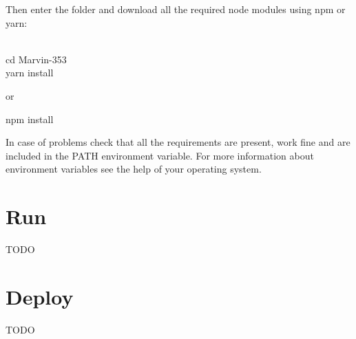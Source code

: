 \documentclass[ManualeSviluppatore.tex]{subfiles}
\begin{document}
Then enter the folder and download all the required node modules using npm or yarn: \\
\\
\begin{ttfamily}
	cd Marvin-353 \\
	yarn install \\
\end{ttfamily}
or \\
\begin{ttfamily}
npm install \\
\end{ttfamily}

In case of problems check that all the requirements are present, work fine and are included in the PATH environment variable. For more information about environment variables see the help of your operating system. \\


\section{Run}

TODO

\section{Deploy}

TODO
\end{document}

